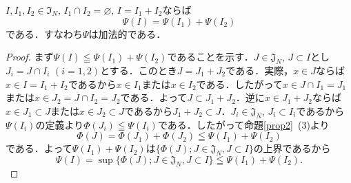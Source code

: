 \documentclass[12pt,a4paper]{jsarticle}
\newcommand{\frakI}{\mathfrak{I}}
\newcommand{\frakJ}{\mathfrak{J}}
\begin{document}
\begin{proposition}
    $I, I_1, I_2 \in \frakI_N$, $I_1 \cap I_2 = \varnothing$, $I = I_1 + I_2$ならば
    \begin{equation*}
        \Psi(I) = \Psi(I_1) + \Psi(I_2)
    \end{equation*}
    である．すなわち$\Psi$は加法的である．
\end{proposition}
\begin{proof}
    まず$\Psi(I) \leqq \Psi(I_1) + \Psi(I_2)$であることを示す．$J \in \frakJ_N$, $J \subset I$とし$J_i = J \cap I_i$ $(i = 1, 2)$とする．このとき$J = J_1 + J_2$である．実際，$x \in J$ならば$x \in I = I_1 + I_2$であるから$x \in I_1$または$x \in I_2$である．したがって$x \in J \cap I_1 = J_1$または$x \in J_2 = J \cap I_2 = J_2$である．よって$J \subset J_1 + J_2$．逆に$x \in J_1 + J_2$ならば$x \in J_1 \subset J$または$x \in J_2 \subset J$であるから$J_1 + J_2 \subset J$．$J_i \in \frakJ_N$, $J_i \subset I_i$であるから$\Psi(I_i)$の定義より$\Phi(J_i) \leqq \Psi(I_i)$である．したがって命題\ref{prop2}~(3)より
    \begin{equation*}
        \Phi(J) = \Phi(J_1) + \Phi(J_2) \leqq \Psi(I_1) + \Psi(I_2)
    \end{equation*}
    である．よって$\Psi(I_1) + \Psi(I_2)$は$\{\Phi(J) ; J \in \frakJ_N, J \subset I\}$の上界であるから
    \begin{equation*}
        \Psi(I) = \sup\{\Phi(J) ; J \in \frakJ_N, J \subset I\} \leqq \Psi(I_1) + \Psi(I_2).
    \end{equation*}


\end{proof}
\end{document}
